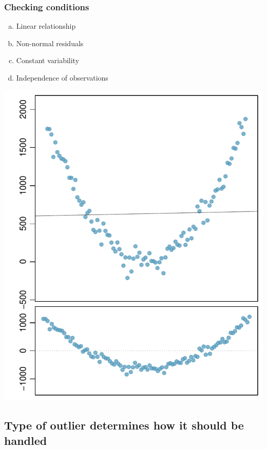 \documentclass[slidestop,compress,mathserif,12pt,t,professionalfonts,xcolor=table]{beamer}
\newcommand{\solnMult}[1]{#1}
\begin{document}
\begin{frame}
\frametitle{Checking conditions}

{
\begin{enumerate}[(a)]
\item \solnMult{Linear relationship}
\item Non-normal residuals
\item Constant variability
\item Independence of observations
\end{enumerate}
}
{
\begin{center}
\includegraphics[width=\textwidth]{figures/problems/nonlinear}
\end{center}
}

\end{frame}


\subsection{Type of outlier determines how it should be handled}
\label{mi6}
\end{document}
